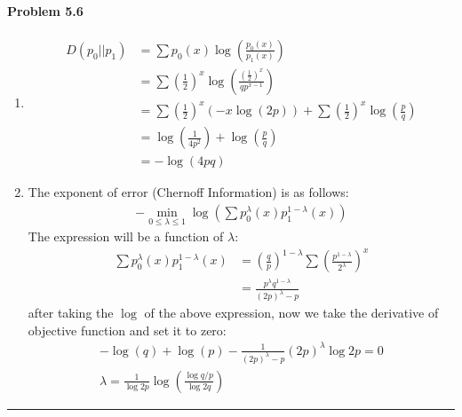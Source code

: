\documentclass[12pt, letterpaper]{scrartcl}
\begin{document}
\paragraph*{Problem 5.6} \hfill\newline
\begin{enumerate}[((a))]
    \item
    \begin{align*}
        D(p_0||p_1)&=\sum p_0(x)\log(\frac{p_0(x)}{p_1(x)})\\
        &=\sum (\frac{1}{2})^x\log(\frac{(\frac{1}{2})^x}{qp^{x-1}})\\
        &=\sum (\frac{1}{2})^x(-x\log(2p)) + \sum (\frac{1}{2})^x\log(\frac{p}{q})\\
        &=\log(\frac{1}{4p^2})+\log(\frac{p}{q})\\
        &=-\log(4pq)
    \end{align*}

    \item
    The exponent of error (Chernoff Information) is as follows:
    \begin{align*}
        -\min_{0\leq\lambda\leq1}\log(\sum p_0^\lambda(x) p_1^{1-\lambda}(x))
    \end{align*}
    The expression will be a function of $\lambda$:
    \begin{align*}
        \sum p_0^\lambda(x) p_1^{1-\lambda}(x)&=(\frac{q}{p})^{1-\lambda}\sum(\frac{p^{1-\lambda}}{2^\lambda})^x\\
        &=\frac{p^\lambda q^{1-\lambda}}{(2p)^\lambda-p}
    \end{align*}
    after taking the $\log$ of the above expression, now we take the derivative of objective function and set it to zero:
    \begin{align*}
        -\log(q)+\log(p)-\frac{1}{(2p)^\lambda-p}(2p)^\lambda\log2p=0\\
        \lambda=\frac{1}{\log2p}\log(\frac{\log q/p}{\log 2q})
    \end{align*}
\end{enumerate}
\hrule
\end{document}
